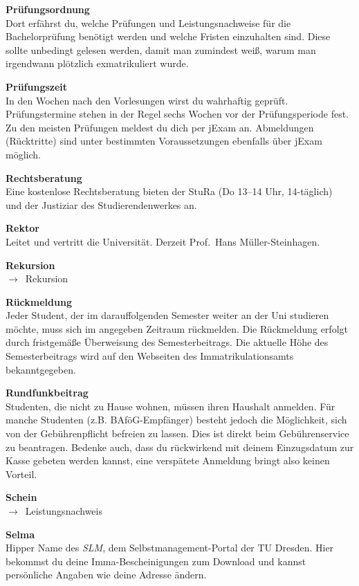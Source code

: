 \begin{multicols}{2}
\textbf{Prüfungsordnung} \\
Dort erfährst du, welche Prüfungen und Leistungsnachweise für die Bachelorprüfung benötigt werden und welche Fristen einzuhalten sind.
Diese sollte unbedingt gelesen werden, damit man zumindest weiß, warum man irgendwann plötzlich exmatrikuliert wurde.

\textbf{Prüfungszeit} \\
In den Wochen nach den Vorlesungen wirst du wahrhaftig geprüft.
Prüfungstermine stehen in der Regel sechs Wochen vor der Prüfungsperiode fest.
Zu den meisten Prüfungen meldest du dich per jExam an.
Abmeldungen (Rücktritte) sind unter bestimmten Voraussetzungen ebenfalls über jExam möglich.

\vfill\columnbreak%

\textbf{Rechtsberatung} \\
Eine kostenlose Rechtsberatung bieten der StuRa (Do 13--14 Uhr, 14-täglich)~ und der Justiziar des Studierendenwerkes an.

\textbf{Rektor} \\
Leitet und vertritt die Universität.
Derzeit Prof.\ Hans Müller-Steinhagen.

\textbf{Rekursion} \\
$\rightarrow$~Rekursion

\textbf{Rückmeldung} \\
Jeder Student, der im darauffolgenden Semester weiter an der Uni studieren möchte, muss sich im angegeben Zeitraum rückmelden.
Die Rückmeldung erfolgt durch fristgemäße Überweisung des Semesterbeitrags.
Die aktuelle Höhe des Semesterbeitrags wird auf den Webseiten des Immatrikulationsamts bekanntgegeben.~

\textbf{Rundfunkbeitrag} \\
Studenten, die nicht zu Hause wohnen, müssen ihren Haushalt anmelden.
Für manche Studenten (z.B. BAföG-Empfänger) besteht jedoch die Möglichkeit, sich von der Gebührenpflicht befreien zu lassen.
Dies ist direkt beim Gebührenservice zu beantragen.
Bedenke auch, dass du rückwirkend mit deinem Einzugsdatum zur Kasse gebeten werden kannst, eine verspätete Anmeldung bringt also keinen Vorteil.

\textbf{Schein} \\
$\rightarrow$~Leistungsnachweis

\textbf{Selma} \\
Hipper Name des \textit{SLM}, dem Selbst\-management-Portal der TU Dresden.
Hier bekommst du deine Imma-Bescheinigungen zum Download und kannst persönliche Angaben wie deine Adresse ändern.~


\end{multicols}
